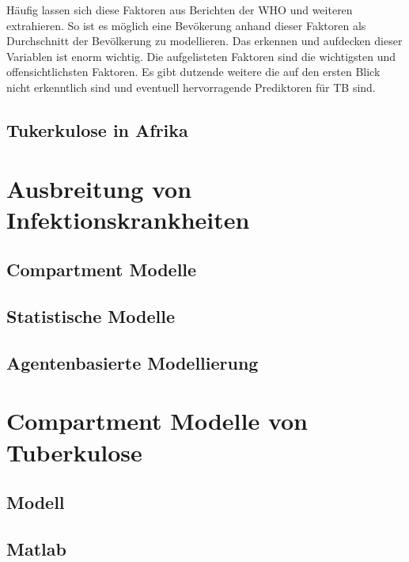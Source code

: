 \documentclass[paper=a4, fontsize=11pt, ngerman, abstract=on]{scrartcl}
\numberwithin{equation}{section} %
\numberwithin{figure}{section} %
\numberwithin{table}{section} %
\begin{document}
Häufig lassen sich diese Faktoren aus Berichten der WHO und weiteren extrahieren. So ist es möglich eine Bevökerung anhand dieser Faktoren als Durchschnitt der Bevölkerung zu modellieren. Das erkennen und aufdecken dieser Variablen ist enorm wichtig. Die aufgelisteten Faktoren sind die wichtigsten und offensichtlichsten Faktoren. Es gibt dutzende weitere die auf den ersten Blick nicht erkenntlich sind und eventuell hervorragende Prediktoren für TB sind.

\subsection{Tukerkulose in Afrika}

\blindtext

\section{Ausbreitung von Infektionskrankheiten}

\blindtext

\subsection{Compartment Modelle}

\blindtext

\subsection{Statistische Modelle}

\blindtext

\subsection{Agentenbasierte Modellierung}

\blindtext

\section{Compartment Modelle von Tuberkulose}

\blindtext

\subsection{Modell}

\blindtext

\subsection{Matlab}
\end{document}
